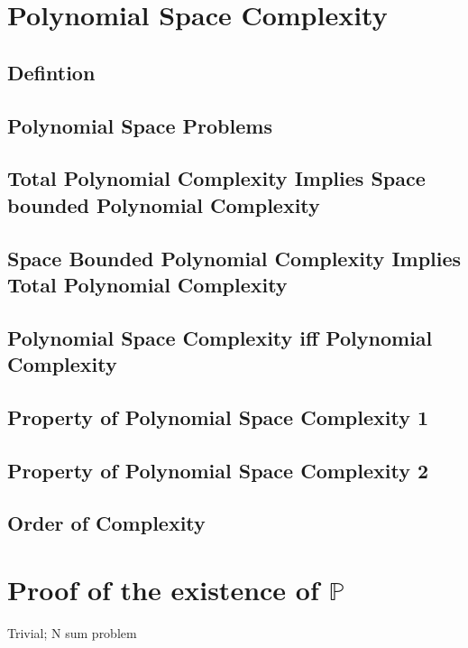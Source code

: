 \documentclass[11pt]{article}
\begin{document}
\newpage
\section{Polynomial Space Complexity}
\subsection{Defintion}
\subsection{Polynomial Space Problems}
\subsection{Total Polynomial Complexity Implies Space bounded Polynomial Complexity}
\subsection{Space Bounded Polynomial Complexity Implies Total Polynomial Complexity}
\subsection{Polynomial Space Complexity iff Polynomial Complexity}
\subsection{Property of Polynomial Space Complexity 1}
\subsection{Property of Polynomial Space Complexity 2}
\subsection{Order of Complexity}
















\newpage
\section{Proof of the existence of $\mathbb{P}$}
Trivial; N sum problem
\end{document}
